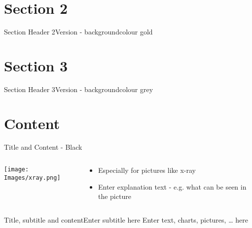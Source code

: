 \documentclass[10pt,compress]{beamer} %
\begin{document}
\section{Section 2}
{
\sectionheaderGold %
\begin{frame}{Section Header 2}{Version - backgroundcolour gold}
\end{frame}
}

\section{Section 3}
{
\sectionheaderGrey %
\begin{frame}{Section Header 3}{Version - backgroundcolour grey}
\end{frame}
}

\section{Content}
{\blackSlide %
\begin{frame}{Title and Content - Black}
\begin{columns}
  \begin{column}{0.3\textwidth}
    \begin{center}
     \texttt{[image: Images/xray.png]}
     \end{center}
  \end{column}
  \begin{column}{0.7\textwidth}  %
    \begin{itemize}
	  \item Especially for pictures like x-ray
	  \item Enter explanation text - e.g. what can be seen in the picture
	\end{itemize}
  \end{column}
\end{columns}

\end{frame}
}

\begin{frame}{Title, subtitle and content}{Enter subtitle here}
Enter text, charts, pictures, … here
\end{frame}
\end{document}
